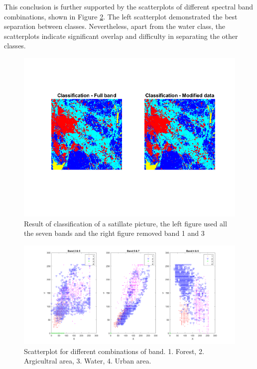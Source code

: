 \documentclass[12pt]{article}
\begin{document}
This conclusion is further supported by the scatterplots of different spectral band combinations, shown in Figure \ref{fig:Q5_scatter}. The left scatterplot demonstrated the best separation between classes. Nevertheless, apart from the water class, the scatterplots indicate significant overlap and difficulty in separating the other classes.
\begin{figure}[h!]
  \centering
  \includegraphics[width = 15cm]{images/Q5_result.png}
  \caption{Result of classification of a satillate picture, the left figure used all the seven bands and the right figure removed band 1 and 3}
  \label{fig:Q5_res}
\end{figure}

\begin{figure}[h!]
  \centering
  \includegraphics[width = 15cm]{images/Q5_scatter.png}
  \caption{Scatterplot for different combinations of band. 1. Forest, 2. Argicultral area, 3. Water, 4. Urban area. }
  \label{fig:Q5_scatter}
\end{figure}
\end{document}
